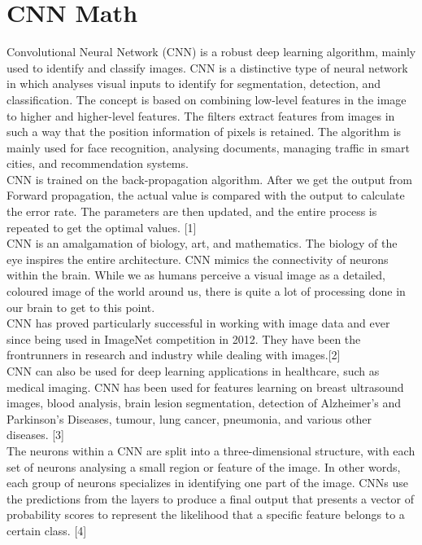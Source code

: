 \documentclass[12pt]{revtex4}
\begin{document}
\section{CNN Math}
Convolutional Neural Network (CNN) is a robust deep learning algorithm, mainly used to identify and classify images. CNN is a distinctive type of neural network in which analyses visual inputs to identify for segmentation, detection, and classification. The concept is based on combining low-level features in the image to higher and higher-level features. The filters extract features from images in such a way that the position information of pixels is retained. The algorithm is mainly used for face recognition, analysing documents, managing traffic in smart cities, and recommendation systems.
\\CNN is trained on the back-propagation algorithm. After we get the output from Forward propagation, the actual value is compared with the output to calculate the error rate. The parameters are then updated, and the entire process is repeated to get the optimal values. [1]
 \\CNN is an amalgamation of biology, art, and mathematics. The biology of the eye inspires the entire architecture. CNN mimics the connectivity of neurons within the brain. While we as humans perceive a visual image as a detailed, coloured image of the world around us, there is quite a lot of processing done in our brain to get to this point. 
\\CNN has proved particularly successful in working with image data and ever since being used in ImageNet competition in 2012. They have been the frontrunners in research and industry while dealing with images.[2]
\\CNN can also be used for deep learning applications in healthcare, such as medical imaging. CNN has been used for features learning on breast ultrasound images, blood analysis, brain lesion segmentation, detection of Alzheimer’s and Parkinson’s Diseases, tumour, lung cancer, pneumonia, and various other diseases. [3] 
\\The neurons within a CNN are split into a three-dimensional structure, with each set of neurons analysing a small region or feature of the image. In other words, each group of neurons specializes in identifying one part of the image. CNNs use the predictions from the layers to produce a final output that presents a vector of probability scores to represent the likelihood that a specific feature belongs to a certain class. [4]
\end{document}
